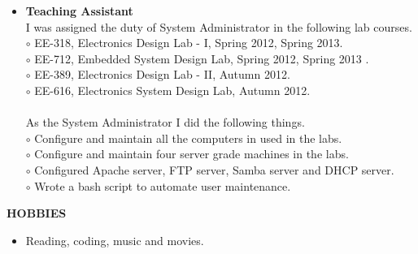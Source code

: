 \documentclass[a4paper,10pt]{article}
\begin{document}
 \begin{itemize}
 \setlength{\itemsep}{1pt}
 \item \textbf{Teaching Assistant} \\
I was assigned the duty of System Administrator in the following lab courses.\\
$\circ$ EE-318, Electronics Design Lab - I, Spring 2012, Spring 2013. \\
$\circ$ EE-712, Embedded System Design Lab, Spring 2012, Spring 2013 . \\ 
$\circ$ EE-389, Electronics Design Lab - II, Autumn 2012.  \\
$\circ$ EE-616, Electronics System Design Lab, Autumn 2012. \\
\qquad \\
As the System Administrator I did the following things. \\
$\circ$ Configure and maintain all the computers in used in the labs. \\
$\circ$ Configure and maintain four server grade machines in the labs. \\
$\circ$ Configured Apache server, FTP server, Samba server and DHCP server. \\
$\circ$ Wrote a bash script to automate user maintenance.
 \end{itemize}

 \colorbox{titleColor}{\parbox{6.5in}{\textbf{HOBBIES}}}

  \begin{itemize}
 \setlength{\itemsep}{1pt}
    \item Reading, coding, music and movies.
  \end{itemize}
\end{document}
